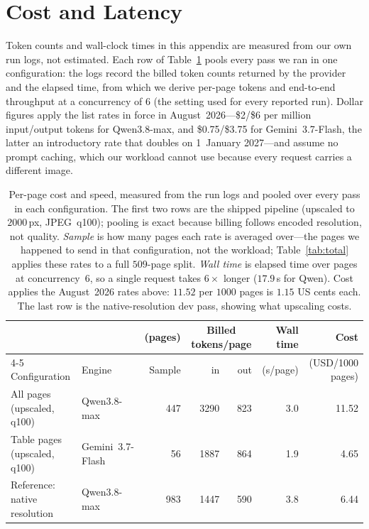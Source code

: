 \documentclass[11pt]{article}
\begin{document}
\section{Cost and Latency}
\label{app:cost}
Token counts and wall-clock times in this appendix are measured from our own run
logs, not estimated. Each row of Table~\ref{tab:cost} pools every pass we ran in one
configuration: the logs record the billed token counts returned by the provider and
the elapsed time, from which we derive per-page tokens and end-to-end throughput at a
concurrency of $6$ (the setting used for every reported run). Dollar figures apply the
list rates in force in August~2026---\$2/\$6 per million input/output tokens for
Qwen3.8-max, and \$0.75/\$3.75 for Gemini~3.7-Flash, the latter an introductory rate
that doubles on 1~January 2027---and assume no prompt caching, which our workload
cannot use because every request carries a different image.

\begin{table}[t]
\centering
\small
\begin{tabular}{llrrrrr}
\toprule
& & (pages) & \multicolumn{2}{c}{Billed tokens/page} & Wall time & Cost \\
\cmidrule(lr){4-5}
Configuration & Engine & Sample & in & out & (s/page) & (USD/1000 pages) \\
\midrule
All pages (upscaled, q100) & Qwen3.8-max & 447 & 3290 & 823 & 3.0 & 11.52 \\
Table pages (upscaled, q100) & Gemini~3.7-Flash & 56 & 1887 & 864 & 1.9 & 4.65 \\
\midrule
Reference: native resolution & Qwen3.8-max & 983 & 1447 & 590 & 3.8 & 6.44 \\
\bottomrule
\end{tabular}
\caption{Per-page cost and speed, measured from the run logs and pooled over every
pass in each configuration. The first two rows are the shipped pipeline (upscaled to
$2000$\,px, JPEG~q100); pooling is exact because billing follows encoded resolution,
not quality. \emph{Sample} is how many pages each rate is averaged over---the pages
we happened to send in that configuration, not the workload; Table~\ref{tab:total}
applies these rates to a full $509$-page split. \emph{Wall time} is elapsed time over
pages at concurrency~$6$, so a
single request takes $6\times$ longer ($17.9$\,s for Qwen). Cost applies the
August~2026 rates above: $11.52$ per $1000$ pages is $1.15$ US cents each. The last
row is the native-resolution dev pass, showing what upscaling costs.}
\label{tab:cost}
\end{table}
\end{document}
